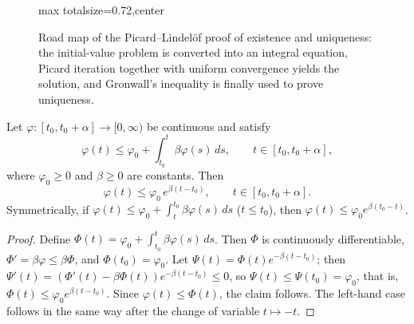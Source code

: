 \begin{figure}[htbp]
\centering
\begin{adjustbox}{max totalsize={\linewidth}{0.72\textheight},center}
\end{adjustbox}
\caption{Road map of the Picard--Lindelöf proof of existence and uniqueness: the initial-value problem is converted into an integral equation, Picard iteration together with uniform convergence yields the solution, and Gronwall's inequality is finally used to prove uniqueness.}
\label{fig:picard_flow}
\end{figure}

\begin{lemma}\label{lem:gronwall}
Let $\varphi: [t_0, t_0+\alpha] \to [0, \infty)$ be continuous and satisfy
\[
\varphi(t) \le \varphi_0 + \int_{t_0}^t \beta \varphi(s)\,ds, \qquad t \in [t_0, t_0+\alpha],
\]
where $\varphi_0 \ge 0$ and $\beta \ge 0$ are constants. Then
\[
\varphi(t) \le \varphi_0\, e^{\beta(t-t_0)}, \qquad t \in [t_0, t_0+\alpha].
\]
Symmetrically, if $\varphi(t) \le \varphi_0 + \int_t^{t_0} \beta \varphi(s)\,ds$ ($t \le t_0$), then $\varphi(t) \le \varphi_0 e^{\beta(t_0-t)}$.
\end{lemma}

\begin{proof}
Define $\Phi(t) = \varphi_0 + \int_{t_0}^t \beta \varphi(s)\,ds$. Then $\Phi$ is continuously differentiable, $\Phi' = \beta \varphi \le \beta \Phi$, and $\Phi(t_0) = \varphi_0$. Let $\Psi(t) = \Phi(t) e^{-\beta(t-t_0)}$; then $\Psi'(t) = (\Phi'(t) - \beta\Phi(t)) e^{-\beta(t-t_0)} \le 0$, so $\Psi(t) \le \Psi(t_0) = \varphi_0$, that is, $\Phi(t) \le \varphi_0 e^{\beta(t-t_0)}$. Since $\varphi(t) \le \Phi(t)$, the claim follows. The left-hand case follows in the same way after the change of variable $t \mapsto -t$.
\end{proof}

